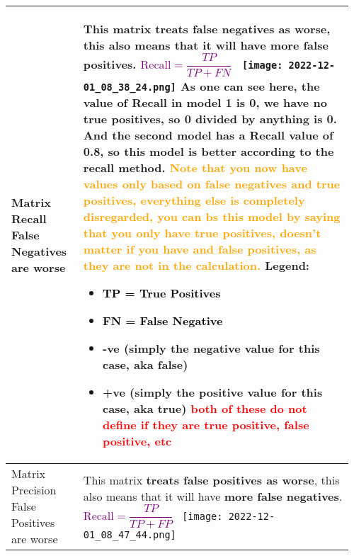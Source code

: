 \documentclass[main.tex,fontsize=8pt,paper=a4,paper=portrait,DIV=calc,]{scrartcl}
\begin{document}
\begin{table}[ht!]
\begin{tabular}{|m{0.2\linewidth}|m{0.755\linewidth}|}
\hline
Matrix Recall \textcolor{OliveGreen}{False Negatives are worse}&
This matrix \textbf{treats false negatives as worse}, this also means that it will have \textbf{more false positives}.\newline
\large \textcolor{purple}{\( \text{Recall} = \dfrac{TP}{TP + FN} \)}\newline
\normalsize \, \newline
\texttt{[image: 2022-12-01\_08\_38\_24.png]}\newline
As one can see here, the value of Recall in model 1 is 0, we have no true positives, so 0 divided by anything is 0.\newline
And the second model has a Recall value of 0.8, so this model is better according to the recall method.\newline
\textcolor{orange}{Note that you now have values only based on false negatives and true positives, everything else is completely disregarded,\newline
you can bs this model by saying that you only have true positives, doesn't matter if you have and false positives, as they are not in the calculation.}\newline
Legend:\newline
\begin{itemize}
\item \textcolor{black}{TP = True Positives}
\item \textcolor{black}{FN = False Negative}
\item -ve (simply the negative value for this case, aka false)
\item +ve (simply the positive value for this case, aka true)\newline
  \textcolor{red}{both of these do not define if they are true positive, false positive, etc}
  \vspace{-3mm}
\end{itemize} \\
\hline
Matrix Precision \textcolor{OliveGreen}{False Positives are worse}&
This matrix \textbf{treats false positives as worse}, this also means that it will have \textbf{more false negatives}.\newline
\large \textcolor{purple}{\( \text{Recall} = \dfrac{TP}{TP + FP} \)}\newline
\normalsize \, \newline
\texttt{[image: 2022-12-01\_08\_47\_44.png]}\newline

\end{tabular}
\end{table}
\end{document}
